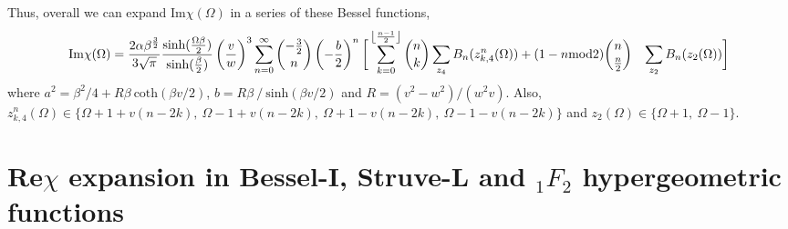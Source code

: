 Thus, overall we can expand Im$\chi(\Omega)$ in a series of these Bessel functions,
\begin{equation}
    \begin{aligned}
        \textrm{Im}\chi(\Omega) = \frac{2\alpha \beta^{\frac{3}{2}}}{3\sqrt{\pi}} \frac{\textrm{sinh}(\frac{\Omega \beta}{2})}{\textrm{sinh}(\frac{\beta}{2})} \left(  \frac{v}{w}\right)^3 \sum_{n=0}^\infty \binom{-\frac{3}{2}}{n} \left(-\frac{b}{2}\right)^n \bigg[\sum_{k=0}^{\floor*{\frac{n-1}{2}}} \binom{n}{k} &\sum_{z_4} B_{n}(z^n_{k,4}(\Omega)) + (1-n\textrm{mod}2) \binom{n}{\frac{n}{2}} &\sum_{z_2} B_{n}(z_2(\Omega))\bigg]
    \end{aligned}
\end{equation}
where $a^2 = \beta^2 / 4 + R \beta\ \textrm{coth}(\beta v / 2)$, $b = R \beta\ /\ \textrm{sinh}(\beta v / 2)$ and $R = (v^2 - w^2) / (w^2 v)$. Also, $z_{k,4}^n(\Omega) \in \{\Omega + 1 + v(n-2k),\ \Omega - 1 + v(n-2k),\ \Omega + 1 - v(n-2k),\ \Omega - 1 - v(n-2k) \}$ and $z_2(\Omega) \in \{\Omega + 1,\ \Omega - 1\}$.\\

\section{Re$\chi$ expansion in Bessel-I, Struve-L and $_1F_2$ hypergeometric functions} 

